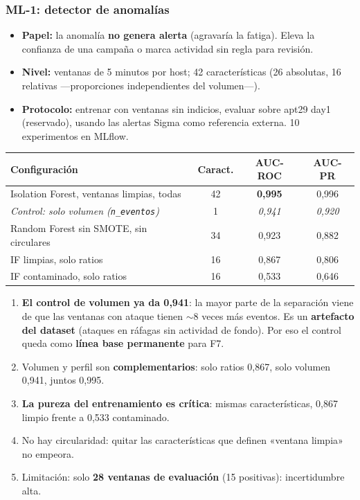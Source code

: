 \documentclass[11pt,a4paper]{article}
\newcommand{\cod}[1]{\texttt{#1}}
\begin{document}
\subsubsection*{ML-1: detector de anomalías}
\begin{itemize}
  \item \textbf{Papel:} la anomalía \textbf{no genera alerta} (agravaría la fatiga). Eleva la confianza de una
        campaña o marca actividad sin regla para revisión.
  \item \textbf{Nivel:} ventanas de 5 minutos por host; 42 características (26 absolutas, 16 relativas
        —proporciones independientes del volumen—).
  \item \textbf{Protocolo:} entrenar con ventanas sin indicios, evaluar sobre apt29 day1 (reservado), usando las
        alertas Sigma como referencia externa. 10 experimentos en MLflow.
\end{itemize}

\begin{center}
\small
\begin{tabular}{lccc}
\toprule
Configuración & Caract. & AUC-ROC & AUC-PR \\
\midrule
Isolation Forest, ventanas limpias, todas & 42 & \textbf{0,995} & 0,996 \\
\textit{Control: solo volumen (\cod{n\_eventos})} & 1 & \textit{0,941} & \textit{0,920} \\
Random Forest sin SMOTE, sin circulares & 34 & 0,923 & 0,882 \\
IF limpias, solo ratios & 16 & 0,867 & 0,806 \\
IF contaminado, solo ratios & 16 & 0,533 & 0,646 \\
\bottomrule
\end{tabular}
\end{center}

\begin{clave}
\begin{enumerate}
  \item \textbf{El control de volumen ya da 0,941}: la mayor parte de la separación viene de que las ventanas
        con ataque tienen $\sim$8 veces más eventos. Es un \textbf{artefacto del dataset} (ataques en ráfagas sin
        actividad de fondo). Por eso el control queda como \textbf{línea base permanente} para F7.
  \item Volumen y perfil son \textbf{complementarios}: solo ratios 0,867, solo volumen 0,941, juntos 0,995.
  \item \textbf{La pureza del entrenamiento es crítica}: mismas características, 0,867 limpio frente a 0,533 contaminado.
  \item No hay circularidad: quitar las características que definen «ventana limpia» no empeora.
  \item Limitación: solo \textbf{28 ventanas de evaluación} (15 positivas): incertidumbre alta.
\end{enumerate}
\end{clave}
\end{document}
